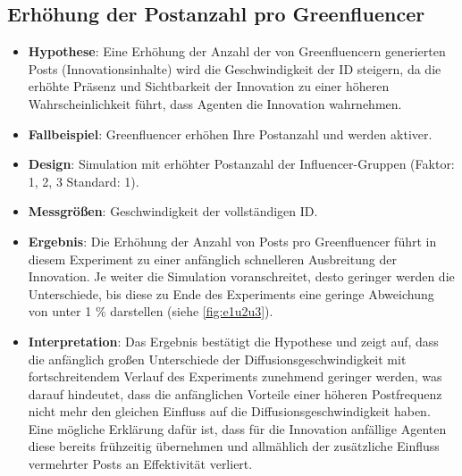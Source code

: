 \documentclass[runningheads]{llncs}
\begin{document}
\subsection{Erhöhung der Postanzahl pro Greenfluencer}
\begin{itemize}
  \item \textbf{Hypothese}: Eine Erhöhung der Anzahl der von Greenfluencern generierten Posts (Innovationsinhalte) wird die Geschwindigkeit der ID steigern, da die erhöhte Präsenz und Sichtbarkeit der Innovation zu einer höheren Wahrscheinlichkeit führt, dass Agenten die Innovation wahrnehmen.
  \item \textbf{Fallbeispiel}: Greenfluencer erhöhen Ihre Postanzahl und werden aktiver. 
  \item \textbf{Design}: Simulation mit erhöhter Postanzahl der Influencer-Gruppen (Faktor: 1, 2, 3 Standard: 1).
  \item \textbf{Messgrößen}: Geschwindigkeit der vollständigen ID.
  \item \textbf{Ergebnis}: Die Erhöhung der Anzahl von Posts pro Greenfluencer führt in diesem Experiment zu einer anfänglich schnelleren Ausbreitung der Innovation. Je weiter die Simulation voranschreitet, desto geringer werden die Unterschiede, bis diese zu Ende des Experiments eine geringe Abweichung von unter 1 \% darstellen (siehe \ref{fig:e1u2u3}). 
  \item \textbf{Interpretation}: Das Ergebnis bestätigt die Hypothese und zeigt auf, dass die anfänglich großen Unterschiede der Diffusionsgeschwindigkeit mit fortschreitendem Verlauf des Experiments zunehmend geringer werden, was darauf hindeutet, dass die anfänglichen Vorteile einer höheren Postfrequenz nicht mehr den gleichen Einfluss auf die Diffusionsgeschwindigkeit haben. Eine mögliche Erklärung dafür ist, dass für die Innovation anfällige Agenten diese bereits frühzeitig übernehmen und allmählich der zusätzliche Einfluss vermehrter Posts an Effektivität verliert.
\end{itemize}
\end{document}
